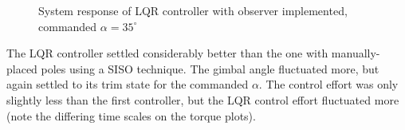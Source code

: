 \documentclass[]{aiaa-tc}%
\begin{document}
	\begin{figure}[H]
		\centering
		\caption{System response of LQR controller with observer implemented, commanded $\alpha=35^{\circ}$ }
		\label{fig:ControllerLQRNom}
	\end{figure}	

	The LQR controller settled considerably better than the one with manually-placed poles using a SISO technique. The gimbal angle fluctuated more, but again settled to its trim state for the commanded $\alpha$. The control effort was only slightly less than the first controller, but the LQR control effort fluctuated more (note the differing time scales on the torque plots).
\end{document}
